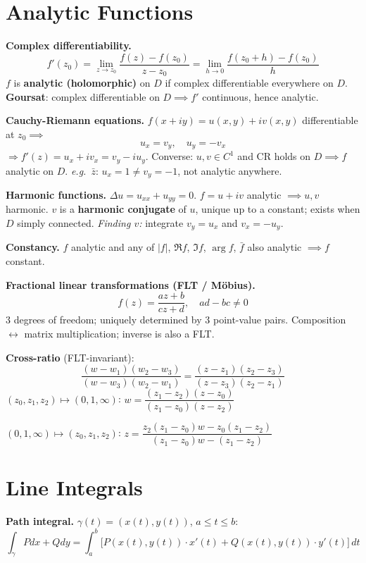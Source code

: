 \documentclass[9pt,twocolumn]{extarticle}
\begin{document}
\section{Analytic Functions}

\textbf{Complex differentiability.}
$$f'(z_0)=\lim_{z\to z_0}\frac{f(z)-f(z_0)}{z-z_0}=\lim_{h\to0}\frac{f(z_0+h)-f(z_0)}{h}$$
$f$ is \textbf{analytic (holomorphic)} on $D$ if complex differentiable everywhere on $D$.\;
\textbf{Goursat}: complex differentiable on $D\implies f'$ continuous, hence analytic.

\textbf{Cauchy-Riemann equations.}
$f(x+iy)=u(x,y)+iv(x,y)$ differentiable at $z_0\implies$
$$u_x=v_y,\quad u_y=-v_x$$
$\Rightarrow f'(z)=u_x+iv_x=v_y-iu_y$.\;
Converse: $u,v\in C^1$ and CR holds on $D\implies f$ analytic on $D$.\;
\textit{e.g.}\ $\bar z$: $u_x=1\ne v_y=-1$, not analytic anywhere.

\textbf{Harmonic functions.} $\Delta u=u_{xx}+u_{yy}=0$.\; $f=u+iv$ analytic $\implies u,v$ harmonic.\;
$v$ is a \textbf{harmonic conjugate} of $u$, unique up to a constant; exists when $D$ simply connected.\;
\textit{Finding $v$:} integrate $v_y=u_x$ and $v_x=-u_y$.

\textbf{Constancy.} $f$ analytic and any of $|f|$, $\Re f$, $\Im f$, $\arg f$, $\bar{f}$ also analytic $\implies f$ constant.

\textbf{Fractional linear transformations (FLT / Möbius).}
$$f(z)=\frac{az+b}{cz+d},\quad ad-bc\ne0$$
3 degrees of freedom; uniquely determined by 3 point-value pairs.
Composition $\leftrightarrow$ matrix multiplication; inverse is also a FLT.

\textbf{Cross-ratio} (FLT-invariant):
$$\frac{(w-w_1)(w_2-w_3)}{(w-w_3)(w_2-w_1)}=\frac{(z-z_1)(z_2-z_3)}{(z-z_3)(z_2-z_1)}$$
$(z_0,z_1,z_2)\mapsto(0,1,\infty)$:\; $w=\dfrac{(z_1-z_2)(z-z_0)}{(z_1-z_0)(z-z_2)}$

$(0,1,\infty)\mapsto(z_0,z_1,z_2)$:\; $z=\dfrac{z_2(z_1-z_0)w-z_0(z_1-z_2)}{(z_1-z_0)w-(z_1-z_2)}$

\section{Line Integrals}

\textbf{Path integral.} $\gamma(t)=(x(t),y(t))$, $a\le t\le b$:
$$\int_\gamma Pdx+Qdy=\int_a^b\!\bigl[P(x(t),y(t))\cdot x'(t)+Q(x(t),y(t))\cdot y'(t)\bigr]\,dt$$
\end{document}
